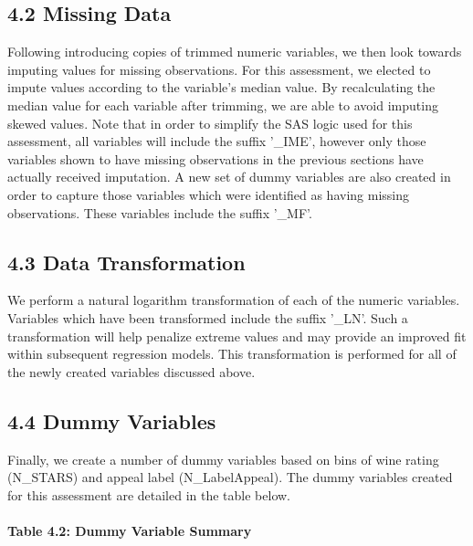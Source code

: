 \documentclass[]{article}
\let\oldparagraph\paragraph
\renewcommand{\paragraph}[1]{\oldparagraph{#1}\mbox{}}
\begin{document}
\subsection{4.2 Missing Data}\label{missing-data}

Following introducing copies of trimmed numeric variables, we then look
towards imputing values for missing observations. For this assessment,
we elected to impute values according to the variable's median value. By
recalculating the median value for each variable after trimming, we are
able to avoid imputing skewed values. Note that in order to simplify the
SAS logic used for this assessment, all variables will include the
suffix '\_IME', however only those variables shown to have missing
observations in the previous sections have actually received imputation.
A new set of dummy variables are also created in order to capture those
variables which were identified as having missing observations. These
variables include the suffix '\_MF'.

\subsection{4.3 Data Transformation}\label{data-transformation}

We perform a natural logarithm transformation of each of the numeric
variables. Variables which have been transformed include the suffix
'\_LN'. Such a transformation will help penalize extreme values and may
provide an improved fit within subsequent regression models. This
transformation is performed for all of the newly created variables
discussed above.

\subsection{4.4 Dummy Variables}\label{dummy-variables}

Finally, we create a number of dummy variables based on bins of wine
rating (N\_STARS) and appeal label (N\_LabelAppeal). The dummy variables
created for this assessment are detailed in the table below.

\paragraph{Table 4.2: Dummy Variable
Summary}\label{table-4.2-dummy-variable-summary}
\end{document}
